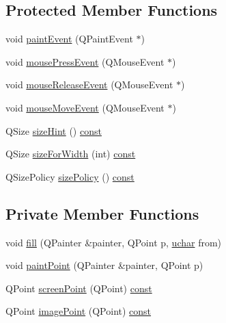 \subsection*{Protected Member Functions}
\begin{DoxyCompactItemize}
\item 
void \hyperlink{classTrivialTileEditor_a8988b7bec4d375fafd3cfa27a5fc99d3}{paint\+Event} (Q\+Paint\+Event $\ast$)
\item 
void \hyperlink{classTrivialTileEditor_abec20ff4b3a707eabe937394d799e549}{mouse\+Press\+Event} (Q\+Mouse\+Event $\ast$)
\item 
void \hyperlink{classTrivialTileEditor_af14f089385de46069ad19019a133ed3d}{mouse\+Release\+Event} (Q\+Mouse\+Event $\ast$)
\item 
void \hyperlink{classTrivialTileEditor_a3fba636b113fee8fb6ae7b4e68f1720d}{mouse\+Move\+Event} (Q\+Mouse\+Event $\ast$)
\item 
Q\+Size \hyperlink{classTrivialTileEditor_ac45832a4759baa304de5bf7356b5a407}{size\+Hint} () \hyperlink{tradstdc_8h_a2c212835823e3c54a8ab6d95c652660e}{const} 
\item 
Q\+Size \hyperlink{classTrivialTileEditor_a98adb9334381fd26c4fc479441da4e08}{size\+For\+Width} (int) \hyperlink{tradstdc_8h_a2c212835823e3c54a8ab6d95c652660e}{const} 
\item 
Q\+Size\+Policy \hyperlink{classTrivialTileEditor_a2e47e5c8b7501bd3e533fc1643cd796f}{size\+Policy} () \hyperlink{tradstdc_8h_a2c212835823e3c54a8ab6d95c652660e}{const} 
\end{DoxyCompactItemize}
\subsection*{Private Member Functions}
\begin{DoxyCompactItemize}
\item 
void \hyperlink{classTrivialTileEditor_a4d5720e6e946b36e1ac2e4339216d471}{fill} (Q\+Painter \&painter, Q\+Point p, \hyperlink{config_8h_a65f85814a8290f9797005d3b28e7e5fc}{uchar} from)
\item 
void \hyperlink{classTrivialTileEditor_a44ea9aec94efe536bb6c383cf1bda58a}{paint\+Point} (Q\+Painter \&painter, Q\+Point p)
\item 
Q\+Point \hyperlink{classTrivialTileEditor_af4b24f8f091be95aa1a9b9b328db9787}{screen\+Point} (Q\+Point) \hyperlink{tradstdc_8h_a2c212835823e3c54a8ab6d95c652660e}{const} 
\item 
Q\+Point \hyperlink{classTrivialTileEditor_a88c624f2f5227f8a14ade8dd347677f7}{image\+Point} (Q\+Point) \hyperlink{tradstdc_8h_a2c212835823e3c54a8ab6d95c652660e}{const} 
\end{DoxyCompactItemize}
